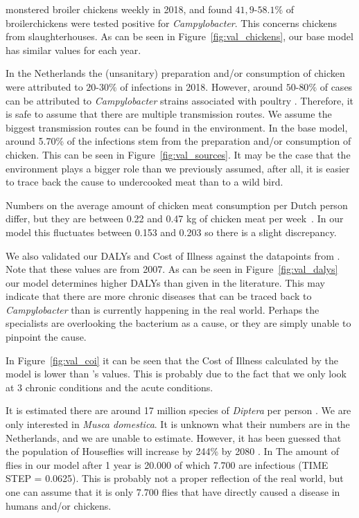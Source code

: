 \textcite{nepluvi_rapportage_2019} monstered broiler chickens weekly in 2018, and found $41,9$-$58.1\%$ of broilerchickens were tested positive for \textit{Campylobacter}. This concerns chickens from slaughterhouses. As can be seen in Figure~\ref{fig:val_chickens}, our base model has similar values for each year.

In the Netherlands the (unsanitary) preparation and/or consumption of chicken were attributed to $20$-$30\%$ of infections in 2018. However, around $50$-$80\%$ of cases can be attributed to \textit{Campylobacter} strains associated with poultry \parencite{cuperus_surveillance_2020, nepluvi_rapportage_2019}. Therefore, it is safe to assume that there are multiple transmission routes. We assume the biggest transmission routes can be found in the environment. In the base model, around 5.70\% of the infections stem from the preparation and/or consumption of chicken. This can be seen in Figure~\ref{fig:val_sources}. It may be the case that the environment plays a bigger role than we previously assumed, after all, it is easier to trace back the cause to undercooked meat than to a wild bird.

Numbers on the average amount of chicken meat consumption per Dutch person differ, but they are between 0.22 and 0.47 kg of chicken meat per week~\parencite{schotman_europese_2018, waveningen_university__research_we_2020}. In our model this fluctuates between 0.153 and 0.203 so there is a slight discrepancy.

We also validated our DALYs and Cost of Illness against the datapoints from \parencite{mangen_campylobacteriosis_2007}. Note that these values are from 2007. As can be seen in Figure~\ref{fig:val_dalys} our model determines higher DALYs than given in the literature. This may indicate that there are more chronic diseases that can be traced back to \textit{Campylobacter} than is currently happening in the real world. Perhaps the specialists are overlooking the bacterium as a cause, or they are simply unable to pinpoint the cause.

In Figure~\ref{fig:val_coi} it can be seen that the Cost of Illness calculated by the model is lower than \citeauthor{mangen_campylobacteriosis_2007}'s values. This is probably due to the fact that we only look at 3 chronic conditions and the acute conditions. 

It is estimated there are around 17 million species of \textit{Diptera} per person \parencite{gorman_trillions_2017}. We are only interested in \textit{Musca domestica}. It is unknown what their numbers are in the Netherlands, and we are unable to estimate. However, it has been guessed that the population of Houseflies will increase by 244\% by 2080 \parencite{mcalister_secret_2017}. In The amount of flies in our model after 1 year is 20.000 of which 7.700 are infectious (TIME STEP = 0.0625). This is probably not a proper reflection of the real world, but one can assume that it is only 7.700 flies that have directly caused a disease in humans and/or chickens.

